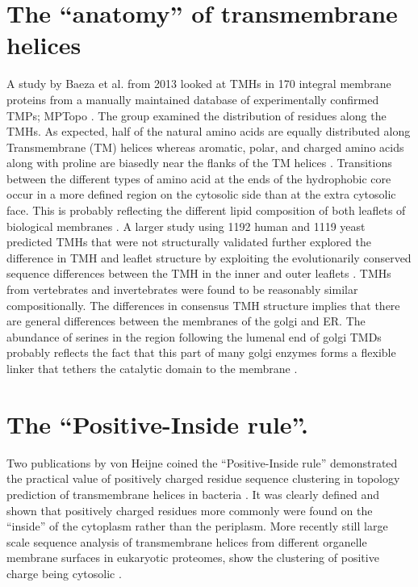 \documentclass[12pt,PhD,twoside]{muthesis}
\begin{document}
\section{The ``anatomy'' of transmembrane helices}
A study by Baeza et al. from 2013 \cite{Baeza-Delgado2013} looked at TMHs in 170 integral membrane proteins from a manually maintained database of experimentally confirmed TMPs; MPTopo \cite{Jayasinghe2001}. The group examined the distribution of residues along the TMHs. As expected, half of the natural amino acids are equally distributed along Transmembrane (TM) helices whereas aromatic, polar, and charged amino acids along with proline are biasedly near the flanks of the TM helices \cite{Baeza-Delgado2013}. Transitions between the different types of amino acid at the ends of the hydrophobic core occur in a more defined region on the cytosolic side than at the extra cytosolic face. This is probably reflecting the different lipid composition of both leaflets of biological membranes \cite{Baeza-Delgado2013}. A larger study using 1192 human and 1119 yeast predicted TMHs that were not structurally validated further explored the difference in TMH and leaflet structure by exploiting the evolutionarily conserved sequence differences between the TMH in the inner and outer leaflets \cite{Sharpe2010}. TMHs from vertebrates and invertebrates were found to be reasonably similar compositionally. The differences in consensus TMH structure implies that there are general differences between the membranes of the golgi and ER. The abundance of serines in the region following the lumenal end of golgi TMDs probably reflects the fact that this part of many golgi enzymes forms a flexible linker that tethers the catalytic domain to the membrane \cite{Sharpe2010}.

\section{The ``Positive-Inside rule''.}
Two publications by von Heijne coined the ``Positive-Inside rule'' demonstrated the practical value of positively charged residue sequence clustering in topology prediction of transmembrane helices in bacteria \cite{VonHeijne1989,VonHeijne1992}. It was clearly defined and shown that positively charged residues more commonly were found on the ``inside'' of the cytoplasm rather than the periplasm. More recently still large scale sequence analysis of transmembrane helices from different organelle membrane surfaces in eukaryotic proteomes, show the clustering of positive charge being cytosolic \cite{Sharpe2010, Baeza-Delgado2013}.
\end{document}
